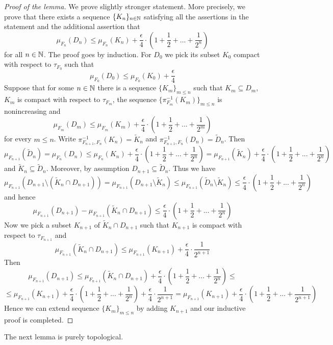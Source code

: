 \begin{proof}[Proof of the lemma]
We prove slightly stronger statement. More precisely, we prove that there exists a sequence $\{K_n\}_{n\in {\mathbb N}}$ satisfying all the assertions in the statement and the additional assertion that
$$\mu_{F_n}(D_n)\leq \mu_{F_n}(K_n) + \frac{\epsilon}{4}\cdot \left(1 + \frac{1}{2} + ... + \frac{1}{2^n}\right)$$
for all $n\in {\mathbb N}$. The proof goes by induction. For $D_0$ we pick its subset $K_0$ compact with respect to $\tau_{F_0}$ such that 
$$\mu_{F_0}(D_0) \leq \mu_{F_0}(K_0) + \frac{\epsilon}{4}$$
Suppose that for some $n\in {\mathbb N}$ there is a sequence $\{K_m\}_{m\leq n}$ such that $K_m\subseteq D_m$, $K_m$ is compact with respect to $\tau_{F_{m}}$, the sequence $\{\pi^{-1}_{F_m}(K_m)\}_{m\leq n}$ is nonincreasing and
$$\mu_{F_m}(D_m)\leq \mu_{F_m}(K_m) + \frac{\epsilon}{4}\cdot \left(1 + \frac{1}{2} + ... + \frac{1}{2^m}\right)$$
for every $m\leq n$. Write $\pi_{F_{n+1},F_n}^{-1}(K_n) = \tilde{K}_n$ and $\pi_{F_{n+1},F_n}^{-1}(D_n) = \tilde{D}_n$. Then
$$\mu_{F_{n+1}}(\tilde{D}_n) = \mu_{F_n}(D_n) \leq \mu_{F_n}(K_n) + \frac{\epsilon}{4}\cdot \left(1 + \frac{1}{2} + ... + \frac{1}{2^n}\right) = \mu_{F_{n+1}}(\tilde{K}_n) + \frac{\epsilon}{4}\cdot \left(1 + \frac{1}{2} + ... + \frac{1}{2^n}\right)$$
and $\tilde{K}_n \subseteq \tilde{D}_n$. Moreover, by assumption $D_{n+1}\subseteq \tilde{D}_n$. Thus we have
$$\mu_{F_{n+1}}\left(D_{n+1} \setminus (\tilde{K}_{n}\cap D_{n+1})\right) = \mu_{F_{n+1}}(D_{n+1} \setminus \tilde{K}_{n}) \leq \mu_{F_{n+1}}(\tilde{D}_{n} \setminus \tilde{K}_{n}) \leq \frac{\epsilon}{4}\cdot \left(1 + \frac{1}{2} + ... + \frac{1}{2^n}\right)$$
and hence
$$\mu_{F_{n+1}}\left(D_{n+1}\right) - \mu_{F_{n+1}}\left(\tilde{K}_{n}\cap D_{n+1}\right) \leq \frac{\epsilon}{4}\cdot \left(1 + \frac{1}{2} + ... + \frac{1}{2^n}\right)$$
Now we pick a subset $K_{n+1}$ of $\tilde{K}_{n}\cap D_{n+1}$ such that $K_{n+1}$ is compact with respect to $\tau_{F_{n+1}}$ and 
$$\mu_{F_{n+1}}(\tilde{K}_{n}\cap D_{n+1}) \leq \mu_{F_{n+1}}(K_{n+1}) + \frac{\epsilon}{4}\cdot \frac{1}{2^{n+1}}$$
Then
$$\mu_{F_{n+1}}\left(D_{n+1}\right) \leq \mu_{F_{n+1}}\left(\tilde{K}_{n}\cap D_{n+1}\right) + \frac{\epsilon}{4}\cdot \left(1 + \frac{1}{2} + ... + \frac{1}{2^n}\right) \leq $$
$$\leq \mu_{F_{n+1}}(K_{n+1}) + \frac{\epsilon}{4}\cdot \left(1 + \frac{1}{2} + ... + \frac{1}{2^n}\right) + \frac{\epsilon}{4}\cdot \frac{1}{2^{n+1}} = \mu_{F_{n+1}}(K_{n+1}) + \frac{\epsilon}{4}\cdot \left(1 + \frac{1}{2} + ... + \frac{1}{2^{n+1}}\right)$$
Hence we can extend sequence $\{K_m\}_{m\leq n}$ by adding $K_{n+1}$ and our inductive proof is completed.
\end{proof}
\noindent
The next lemma is purely topological.

